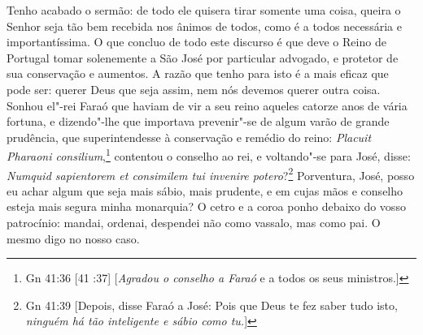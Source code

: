 Tenho acabado o sermão: de todo ele quisera tirar somente uma coisa,
queira o Senhor seja tão bem recebida nos ânimos de todos, como é a
todos necessária e importantíssima. O que concluo de todo este discurso
é que deve o Reino de Portugal tomar solenemente a São José por
particular advogado, e protetor de sua conservação e aumentos. A razão que tenho
para isto é a mais eficaz que pode ser: querer Deus que seja assim, nem
nós devemos querer outra coisa. Sonhou el"-rei Faraó que haviam de vir a
seu reino aqueles catorze anos de vária fortuna, e dizendo"-lhe que
importava prevenir"-se de algum varão de grande prudência, que
superintendesse à conservação e remédio do reino: \emph{Placuit Pharaoni
consilium},\footnote{Gn 41:36 [41 :37] [\textit{Agradou o conselho a Faraó} e a todos os seus ministros.]} contentou o conselho ao rei, e voltando"-se
para José, disse: \emph{Numquid sapientorem et consimilem tui invenire
potero}?\footnote{Gn 41:39 [Depois, disse Faraó a José: Pois que Deus te fez saber tudo isto, \textit{ninguém há tão inteligente e sábio como tu.}]} Porventura, José, posso eu achar algum que seja mais
sábio, mais prudente, e em cujas mãos e conselho esteja mais segura
minha monarquia? O cetro e a coroa ponho debaixo do vosso patrocínio:
mandai, ordenai, despendei não como vassalo, mas como pai. O mesmo digo
no nosso caso.


